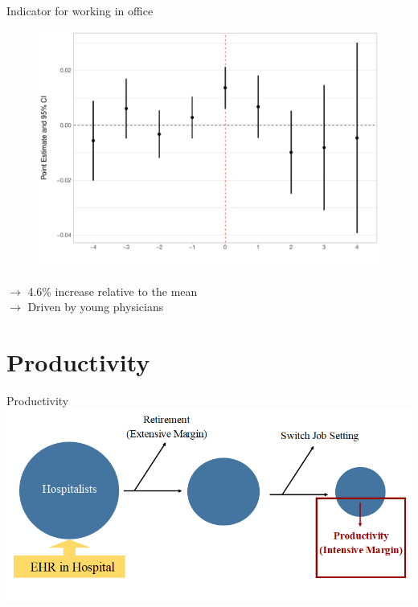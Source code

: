 \documentclass[10pt]{beamer}
\begin{document}
\begin{frame}{Indicator for working in office}
\begin{figure}[ht]
    \centering
    \includegraphics[scale=.35]{Objects/Presentation_office_all.pdf}
\end{figure}
$\rightarrow$ 4.6\% increase relative to the mean\\
$\rightarrow$ Driven by young physicians
\end{frame}





\section{Productivity}





\begin{frame}{Productivity}
\centering
\includegraphics[scale=.45]{Objects/EHR_FlowChart_Productivity.PNG}
\end{frame}
\end{document}

